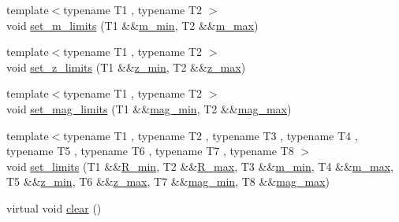 \begin{DoxyCompactItemize}
\item 
{\footnotesize template$<$typename T1 , typename T2 $>$ }\\void \hyperlink{classIceBRG_1_1pair__bin__summary_ac7c7f0aaa8f116d0fe1209b7c5ff6559}{set\-\_\-m\-\_\-limits} (T1 \&\&\hyperlink{classIceBRG_1_1pair__bin__summary_a3d298870839005a013bbb03a51a9b596}{m\-\_\-min}, T2 \&\&\hyperlink{classIceBRG_1_1pair__bin__summary_a385862dcbf0238834d8638a9e79c37fd}{m\-\_\-max})
\item 
{\footnotesize template$<$typename T1 , typename T2 $>$ }\\void \hyperlink{classIceBRG_1_1pair__bin__summary_a218aceacdec198c9c6a1b82df250a931}{set\-\_\-z\-\_\-limits} (T1 \&\&\hyperlink{classIceBRG_1_1pair__bin__summary_aba3930b9f685f44653899d6087217530}{z\-\_\-min}, T2 \&\&\hyperlink{classIceBRG_1_1pair__bin__summary_adcc3f2b945ea7b0bef4aa3542ee230cd}{z\-\_\-max})
\item 
{\footnotesize template$<$typename T1 , typename T2 $>$ }\\void \hyperlink{classIceBRG_1_1pair__bin__summary_a681194896012615153d53eb521d93126}{set\-\_\-mag\-\_\-limits} (T1 \&\&\hyperlink{classIceBRG_1_1pair__bin__summary_a40cc6096a80b23659359b0a58f10cae2}{mag\-\_\-min}, T2 \&\&\hyperlink{classIceBRG_1_1pair__bin__summary_a9a13a840877d52c2eb0387e3ca7f9a70}{mag\-\_\-max})
\item 
{\footnotesize template$<$typename T1 , typename T2 , typename T3 , typename T4 , typename T5 , typename T6 , typename T7 , typename T8 $>$ }\\void \hyperlink{classIceBRG_1_1pair__bin__summary_ab0f435851f15bcd9ac594181be365c01}{set\-\_\-limits} (T1 \&\&\hyperlink{classIceBRG_1_1pair__bin__summary_af1ee4f7eeb70c23843a0ad4af2f41ef9}{R\-\_\-min}, T2 \&\&\hyperlink{classIceBRG_1_1pair__bin__summary_a26bb6d459f592d9ff9f4a11255d5884b}{R\-\_\-max}, T3 \&\&\hyperlink{classIceBRG_1_1pair__bin__summary_a3d298870839005a013bbb03a51a9b596}{m\-\_\-min}, T4 \&\&\hyperlink{classIceBRG_1_1pair__bin__summary_a385862dcbf0238834d8638a9e79c37fd}{m\-\_\-max}, T5 \&\&\hyperlink{classIceBRG_1_1pair__bin__summary_aba3930b9f685f44653899d6087217530}{z\-\_\-min}, T6 \&\&\hyperlink{classIceBRG_1_1pair__bin__summary_adcc3f2b945ea7b0bef4aa3542ee230cd}{z\-\_\-max}, T7 \&\&\hyperlink{classIceBRG_1_1pair__bin__summary_a40cc6096a80b23659359b0a58f10cae2}{mag\-\_\-min}, T8 \&\&\hyperlink{classIceBRG_1_1pair__bin__summary_a9a13a840877d52c2eb0387e3ca7f9a70}{mag\-\_\-max})
\item 
virtual void \hyperlink{classIceBRG_1_1pair__bin__summary_a916bb85a5a7b6be8ec21305beddcb966}{clear} ()

\end{DoxyCompactItemize}
